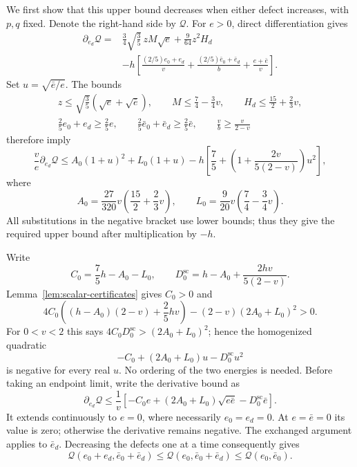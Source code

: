 We first show that this upper bound decreases when either defect
increases, with $p,q$ fixed. Denote the right-hand side by $\mathcal Q$.
For $e>0$, direct differentiation gives
\[
\begin{aligned}
 \partial_{e_d}\mathcal Q={}&
       \frac34\sqrt{\frac35}\,zM\sqrt e
       +\frac9{64}z^2H_d\\
 &-h\left[
       \frac{(2/5)e_0+e_d}{v}
       +\frac{(2/5)\bar e_0+\bar e_d}{b}
       +\frac{e+\bar e}{v}\right].
\end{aligned}
\]
Set $u=\sqrt{\bar e/e}$. The bounds
\[
\begin{gathered}
 z\le\sqrt{\frac35}(\sqrt e+\sqrt{\bar e}),\qquad
 M\le\frac74-\frac34v,\qquad H_d\le\frac{15}{2}+\frac23v,\\
 \frac25e_0+e_d\ge\frac25e,\qquad
 \frac25\bar e_0+\bar e_d\ge\frac25\bar e,
 \qquad \frac vb\ge\frac{v}{2-v}
\end{gathered}
\]
therefore imply
\[
 \frac ve\partial_{e_d}\mathcal Q
 \le A_0(1+u)^2+L_0(1+u)
       -h\left[\frac75+
          \left(1+\frac{2v}{5(2-v)}\right)u^2\right],
\]
where
\[
 A_0=\frac{27}{320}v\left(\frac{15}{2}+\frac23v\right),
 \qquad L_0=\frac9{20}v\left(\frac74-\frac34v\right).
\]
All substitutions in the negative bracket use lower bounds; thus they
give the required upper bound after multiplication by $-h$.

Write
\[
 C_0=\frac75h-A_0-L_0,\qquad
 D_0^{\mathrm{sc}}=h-A_0+\frac{2hv}{5(2-v)}.
\]
Lemma~\ref{lem:scalar-certificates} gives $C_0>0$ and
\[
 4C_0\left((h-A_0)(2-v)+\frac25hv\right)
       -(2-v)(2A_0+L_0)^2>0.
\]
For $0<v<2$ this says
$4C_0D_0^{\mathrm{sc}}>(2A_0+L_0)^2$; hence the homogenized
quadratic
\[
 -C_0+(2A_0+L_0)u-D_0^{\mathrm{sc}}u^2
\]
is negative for every real $u$. No ordering of the two energies is
needed. Before taking an endpoint limit, write the derivative bound as
\[
 \partial_{e_d}\mathcal Q\le\frac1v
 \left[-C_0e+(2A_0+L_0)\sqrt{e\bar e}
                    -D_0^{\mathrm{sc}}\bar e\right].
\]
It extends continuously to $e=0$, where necessarily $e_0=e_d=0$.
At $e=\bar e=0$ its value is zero; otherwise the derivative remains
negative. The exchanged argument applies to $\bar e_d$. Decreasing
the defects one at a time consequently gives
\[
 \mathcal Q(e_0+e_d,\bar e_0+\bar e_d)
 \le\mathcal Q(e_0,\bar e_0+\bar e_d)
 \le\mathcal Q(e_0,\bar e_0).
\]

